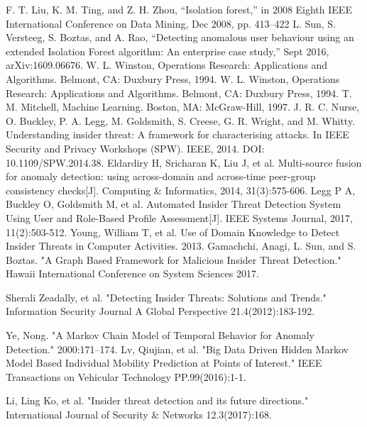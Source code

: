 \documentclass[conference]{IEEEtran}
\begin{document}
\begin{thebibliography}{00}
F. T. Liu, K. M. Ting, and Z. H. Zhou, “Isolation forest,” in 2008 Eighth IEEE International Conference on Data Mining,
Dec 2008, pp. 413–422
L. Sun, S. Versteeg, S. Boztas, and A. Rao, “Detecting anomalous user behaviour using an extended Isolation Forest algorithm: An enterprise case study,” Sept 2016, arXiv:1609.06676.
W. L. Winston, Operations Research: Applications and Algorithms. Belmont, CA: Duxbury Press, 1994.
W. L. Winston, Operations Research: Applications and Algorithms. Belmont, CA: Duxbury Press, 1994.
T. M. Mitchell, Machine Learning. Boston,
MA: McGraw-Hill, 1997.
 J. R. C. Nurse, O. Buckley, P. A. Legg, M. Goldsmith, S. Creese, G. R. Wright, and M. Whitty. Understanding insider threat: A framework for characterising attacks. In IEEE Security and Privacy Workshops (SPW). IEEE, 2014. DOI: 10.1109/SPW.2014.38.
Eldardiry H, Sricharan K, Liu J, et al. Multi-source fusion for anomaly detection: using across-domain and across-time peer-group consistency checks[J]. Computing \& Informatics, 2014, 31(3):575-606.
 Legg P A, Buckley O, Goldsmith M, et al. Automated Insider Threat Detection System Using User and Role-Based Profile Assessment[J]. IEEE Systems Journal, 2017, 11(2):503-512.
 Young, William T, et al. Use of Domain Knowledge to Detect Insider Threats in Computer Activities.  2013.
 Gamachchi, Anagi, L. Sun, and S. Boztas. "A Graph Based Framework for Malicious Insider Threat Detection." Hawaii International Conference on System Sciences 2017.

 Sherali   Zeadally, et al. "Detecting Insider Threats: Solutions and Trends." Information Security Journal A Global Perspective 21.4(2012):183-192.

 Ye, Nong. "A Markov Chain Model of Temporal Behavior for Anomaly Detection." 2000:171--174.
 Lv, Qiujian, et al. "Big Data Driven Hidden Markov Model Based Individual Mobility Prediction at Points of Interest." IEEE Transactions on Vehicular Technology PP.99(2016):1-1.

 Li, Ling Ko, et al. "Insider threat detection and its future directions." International Journal of Security & Networks 12.3(2017):168.

\fi








\end{thebibliography}
\end{document}
